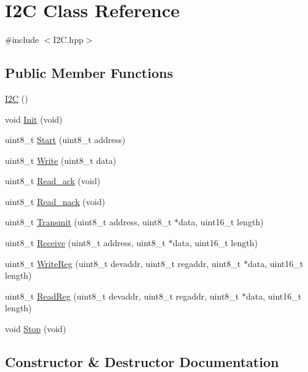 \hypertarget{classI2C}{}\section{I2C Class Reference}
\label{classI2C}


{\ttfamily \#include $<$I2\+C.\+hpp$>$}

\subsection*{Public Member Functions}
\begin{DoxyCompactItemize}
\item 
\hyperlink{classI2C_a7a9a84fccdacb3346ff97d6f3e158850}{I2C} ()
\item 
void \hyperlink{classI2C_ab6cd0165be5e59dfe57976f1ae4325ec}{Init} (void)
\item 
uint8\+\_\+t \hyperlink{classI2C_a2d89860048673ed968d218a749080916}{Start} (uint8\+\_\+t address)
\item 
uint8\+\_\+t \hyperlink{classI2C_aa18dde601c811e06dda1be29c139dd83}{Write} (uint8\+\_\+t data)
\item 
uint8\+\_\+t \hyperlink{classI2C_aa538a5b392f83063c3d484ec35cf1bcd}{Read\+\_\+ack} (void)
\item 
uint8\+\_\+t \hyperlink{classI2C_af40aac783e94fcfcd1f9c8cbfe1eeb37}{Read\+\_\+nack} (void)
\item 
uint8\+\_\+t \hyperlink{classI2C_a9eb58b51adaedc941abf120c4df3c481}{Transmit} (uint8\+\_\+t address, uint8\+\_\+t $\ast$data, uint16\+\_\+t length)
\item 
uint8\+\_\+t \hyperlink{classI2C_ad0c64a4e373b4015647a11c298af4d47}{Receive} (uint8\+\_\+t address, uint8\+\_\+t $\ast$data, uint16\+\_\+t length)
\item 
uint8\+\_\+t \hyperlink{classI2C_a4f7e7e3bb2527b721f370ec88011b401}{Write\+Reg} (uint8\+\_\+t devaddr, uint8\+\_\+t regaddr, uint8\+\_\+t $\ast$data, uint16\+\_\+t length)
\item 
uint8\+\_\+t \hyperlink{classI2C_aee4e012db3dc019536ad3da5632cc04a}{Read\+Reg} (uint8\+\_\+t devaddr, uint8\+\_\+t regaddr, uint8\+\_\+t $\ast$data, uint16\+\_\+t length)
\item 
void \hyperlink{classI2C_a5d3e0b1de395932284e2e010a0160b5f}{Stop} (void)
\end{DoxyCompactItemize}


\subsection{Constructor \& Destructor Documentation}
